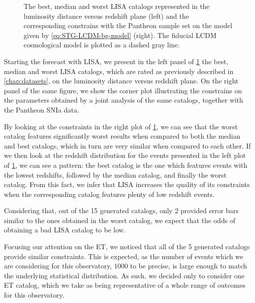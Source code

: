 \begin{figure}[h!]
\begin{subfigure}[t]{0.49\textwidth}
    \end{subfigure}
    \caption[The best, median and worst LISA catalogs represented in the luminosity distance versus redshift plane (left) and the corresponding constrains with the Pantheon sample set on the $f(Q)$ model with $\Lambda$CDM background (right). The fiducial $\Lambda$CDM cosmological model is plotted as a dashed gray line.]
    {The best, median and worst \gls{LISA} catalogs represented in the luminosity distance versus redshift plane (left) and the corresponding constrains with the Pantheon sample set on the model given by \cref{eq:STG-LCDM-bg-model} (right). The fiducial \gls{LCDM} cosmological model is plotted as a dashed gray line.}
    \label{fig:fQ-LCDM-bg_LISA}
\end{figure}

Starting the forecast with \gls{LISA}, we present in the left panel of \cref{fig:fQ-LCDM-bg_LISA} the best, median and worst \gls{LISA} catalogs, which are rated as previously described in \cref{chap:datasets}, on the luminosity distance versus redshift plane. On the right panel of the same figure, we show the corner plot illustrating the constrains on the parameters obtained by a joint analysis of the same catalogs, together with the Pantheon \gls{SNIa} data.

By looking at the constraints in the right plot of \cref{fig:fQ-LCDM-bg_LISA}, we can see that the worst catalog features significantly worst results when compared to both the median and best catalogs, which in turn are very similar when compared to each other. If we then look at the redshift distribution for the events presented in the left plot of \cref{fig:fQ-LCDM-bg_LISA}, we can see a pattern: the best catalog is the one which features events with the lowest redshifts, followed by the median catalog, and finally the worst catalog. From this fact, we infer that \gls{LISA} increases the quality of its constraints when the corresponding catalog features plenty of low redshift events.

Considering that, out of the 15 generated catalogs, only 2 provided error bars similar to the ones obtained in the worst catalog, we expect that the odds of obtaining a bad \gls{LISA} catalog to be low.

Focusing our attention on the \gls{ET}, we noticed that all of the 5 generated catalogs provide similar constraints. This is expected, as the number of events which we are considering for this observatory, $1000$ to be precise, is large enough to match the underlying statistical distribution. As such, we decided only to consider one \gls{ET} catalog, which we take as being representative of a whole range of outcomes for this observatory.

